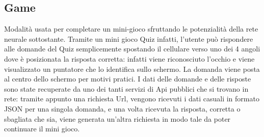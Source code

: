 \documentclass[11pt]{article}
\begin{document}
\newpage
\subsection{Game}
Modalità usata per completare un mini-gioco sfruttando le potenzialità della rete neurale sottostante. Tramite un mini gioco Quiz infatti, l'utente può rispondere alle domande del Quiz semplicemente spostando il cellulare verso uno dei 4 angoli dove è posizionata la risposta corretta: infatti viene riconosciuto l'occhio e viene visualizzato un puntatore che lo identifica sullo schermo. La domanda viene posta al centro dello schermo per motivi pratici.
\newline
I dati delle domande e delle risposte sono state recuperate da uno dei tanti servizi di Api pubblici che si trovano in rete: tramite appunto una richiesta Url, vengono ricevuti i dati casuali in formato JSON per una singola domanda, e una volta ricevuta la risposta, corretta o sbagliata che sia, viene generata un'altra richiesta in modo tale da poter continuare il mini gioco. 
\end{document}
